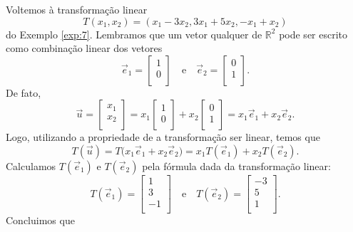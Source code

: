 Voltemos à transformação linear
\begin{equation}
T(x_1, x_2) = (x_1 - 3 x_2, 3x_1 + 5x_2, -x_1 + x_2)
\end{equation} do Exemplo \ref{exp:7}. Lembramos que um vetor qualquer de $\mathbb{R}^2$ pode ser escrito como combinação linear dos vetores
\begin{equation}
\vec{e}_1 =
\left[
  \begin{array}{r}
    1 \\
    0 \\
  \end{array}
\right]\quad \text{e}\quad
\vec{e}_2 =
\left[
  \begin{array}{c}
    0\\
    1\\
  \end{array}
\right].
\end{equation} De fato,
\begin{equation}
\vec{u} =
\left[
  \begin{array}{r}
    x_1 \\
    x_2 \\
  \end{array}
\right] =
x_1 \left[
  \begin{array}{r}
    1 \\
    0 \\
  \end{array}
\right] +
x_2 \left[
  \begin{array}{c}
    0\\
    1\\
  \end{array}
\right] = x_1 \vec{e}_1 + x_2 \vec{e}_2.
\end{equation} Logo, utilizando a propriedade de a transformação ser linear, temos que
\begin{equation}
T( \vec{u} ) = T\big( x_1 \vec{e}_1 + x_2 \vec{e}_2 \big) = x_1 T(\vec{e}_1) + x_2 T(\vec{e}_2).
\end{equation} Calculamos $T(\vec{e}_1)$ e $T(\vec{e}_2)$ pela fórmula dada da transformação linear:
\begin{equation}
T(\vec{e}_1) =
\left[
  \begin{array}{r}
    1 \\
    3 \\
    -1 \\
  \end{array}
\right] \quad \text{e}\quad
T(\vec{e}_2) =
\left[
  \begin{array}{r}
    -3 \\
     5 \\
     1 \\
  \end{array}
\right].
\end{equation} Concluimos que
